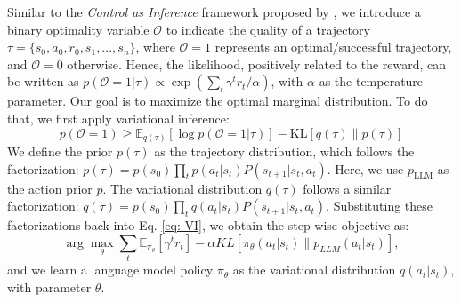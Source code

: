 \documentclass{article} %
\theoremstyle{plain}
\theoremstyle{definition}
\theoremstyle{remark}
\newcommand{\eq}{{Eq. }}
\begin{document}
{ %

{
Similar to the \textit{Control as Inference} framework proposed by \citep{levine2018reinforcement}, we introduce a binary optimality variable $\mathcal{O}$ to indicate the quality of a trajectory $\tau = \{s_0, a_0, r_0, s_1, ..., s_n\}$, where $\mathcal{O}=1$ represents an optimal/successful trajectory, and $\mathcal{O}=0$ otherwise. Hence, the likelihood, positively related to the reward, can be written as $p(\mathcal{O}=1|\tau) \propto \exp \left(\sum_t \gamma^t r_t / \alpha \right)$, with $\alpha$ as the temperature parameter.
Our goal is to maximize the optimal marginal distribution. To do that, we first apply variational inference:
\begin{equation}\label{eq: VI}
    p(\mathcal{O}=1) \geq \mathbb{E}_{q(\tau)}\left[\log p(\mathcal{O}=1|\tau) \right] - \text{KL}\left[q(\tau) \| p(\tau)\right]
\end{equation}
We define the prior $p(\tau)$ as the trajectory distribution, which follows the factorization: $p(\tau) = p(s_0) \prod_t p(a_t|s_t) P(s_{t+1}|s_t, a_t)$. Here, we use $p_\text{LLM}$ as the action prior $p$. The variational distribution $q(\tau)$ follows a similar factorization: $q(\tau) = p(s_0) \prod_t q(a_t|s_t) P(s_{t+1}|s_t, a_t)$. Substituting these factorizations back into \eq \ref{eq: VI}, we obtain the step-wise objective as:
\begin{equation}
\label{variation}
    \arg\max_\theta \sum_{t} \mathbb{E}_{\pi_{\theta}}\left[\gamma^t r_t \right] - \alpha {KL}\left[ \pi_{\theta}(a_t|s_t) \| p_{LLM}(a_t|s_t) \right],
\end{equation}
and we learn a language model policy $\pi_\theta$ as the variational distribution $q(a_t|s_t)$, with parameter $\theta$.
}}
\end{document}
